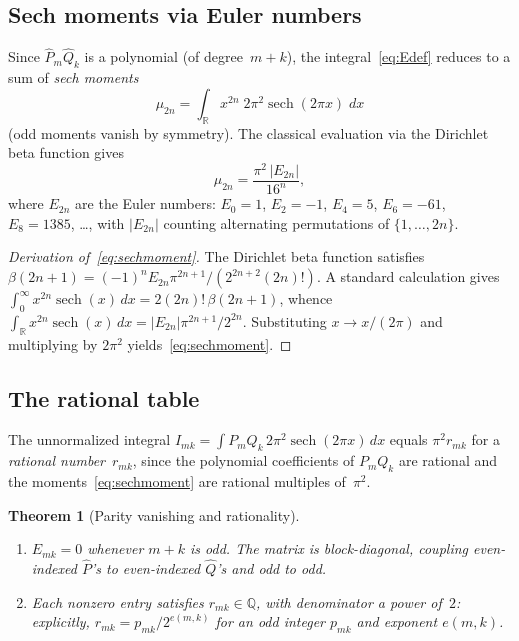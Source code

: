 \documentclass[11pt,a4paper]{article}
\newtheorem{theorem}{Theorem}[section]
\newcommand{\R}{\mathbb{R}}
\newcommand{\Q}{\mathbb{Q}}
\begin{document}
\subsection{Sech moments via Euler numbers}

Since $\widehat{P}_m\widehat{Q}_k$ is a polynomial (of
degree~$m+k$), the integral~\eqref{eq:Edef} reduces to a sum of
\emph{sech moments}
\[
  \mu_{2n} = \int_\R x^{2n}\; 2\pi^2 \operatorname{sech}(2\pi x)\; dx
\]
(odd moments vanish by symmetry). The classical evaluation via
the Dirichlet beta function gives
\begin{equation}\label{eq:sechmoment}
  \mu_{2n} = \frac{\pi^2\,|E_{2n}|}{16^n},
\end{equation}
where $E_{2n}$ are the Euler numbers:
$E_0 = 1$, $E_2 = -1$, $E_4 = 5$, $E_6 = -61$, $E_8 = 1385$,
\ldots, with $|E_{2n}|$ counting alternating permutations of
$\{1,\ldots,2n\}$.

\begin{proof}[Derivation of~\eqref{eq:sechmoment}]
The Dirichlet beta function satisfies
$\beta(2n{+}1) = (-1)^n E_{2n}\pi^{2n+1}\!/(2^{2n+2}(2n)!)$.
A standard calculation gives
$\int_0^\infty \! x^{2n}\operatorname{sech}(x)\,dx
= 2(2n)!\,\beta(2n{+}1)$, whence
$\int_\R x^{2n}\operatorname{sech}(x)\,dx
= |E_{2n}|\pi^{2n+1}\!/2^{2n}$.
Substituting $x \to x/(2\pi)$ and multiplying by $2\pi^2$
yields~\eqref{eq:sechmoment}.
\end{proof}

\subsection{The rational table}

The unnormalized integral
$I_{mk} = \int P_m Q_k\, 2\pi^2\operatorname{sech}(2\pi x)\,dx$
equals $\pi^2 r_{mk}$ for a \emph{rational number}~$r_{mk}$,
since the polynomial coefficients of $P_m Q_k$ are rational and
the moments~\eqref{eq:sechmoment} are rational multiples
of~$\pi^2$.

\begin{theorem}[Parity vanishing and rationality]\label{thm:main}
\begin{enumerate}
\item $E_{mk} = 0$ whenever $m+k$ is odd. The matrix is
  block-diagonal, coupling even-indexed $\widehat{P}$'s to
  even-indexed $\widehat{Q}$'s and odd to odd.
\item Each nonzero entry satisfies
  $r_{mk} \in \Q$, with denominator a power of~$2$:
  explicitly, $r_{mk} = p_{mk}/2^{e(m,k)}$ for an
  odd integer $p_{mk}$ and exponent $e(m,k)$.
\end{enumerate}
\end{theorem}
\end{document}
